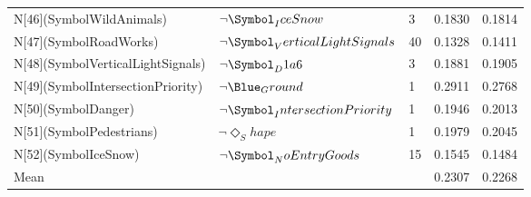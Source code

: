 \begin{tabular}{lllll}
N[46](SymbolWildAnimals) & $\neg \Symbol_IceSnow$ & 3 & 0.1830 & 0.1814 \\
N[47](SymbolRoadWorks) & $\neg \Symbol_VerticalLightSignals$ & 40 & 0.1328 & 0.1411 \\
N[48](SymbolVerticalLightSignals) & $\neg \Symbol_D1a6$ & 3 & 0.1881 & 0.1905 \\
N[49](SymbolIntersectionPriority) & $\neg \Blue_Ground$ & 1 & 0.2911 & 0.2768 \\
N[50](SymbolDanger) & $\neg \Symbol_IntersectionPriority$ & 1 & 0.1946 & 0.2013 \\
N[51](SymbolPedestrians) & $\neg \Diamond_Shape$ & 1 & 0.1979 & 0.2045 \\
N[52](SymbolIceSnow) & $\neg \Symbol_NoEntryGoods$ & 15 & 0.1545 & 0.1484 \\
Mean &  &  & 0.2307 & 0.2268 \\
\bottomrule
\end{tabular}
